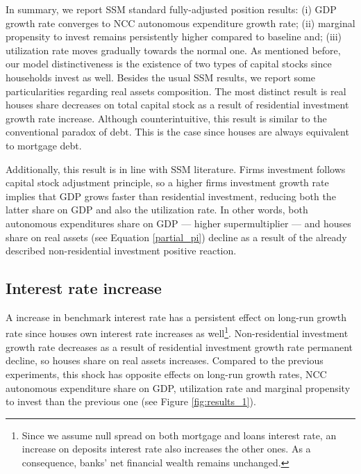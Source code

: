 \documentclass[11pt]{article}
\begin{document}
In summary, we report SSM standard fully-adjusted position results:
    (i) GDP growth rate converges to NCC autonomous expenditure growth rate;
    (ii) marginal propensity to invest remains persistently higher compared to baseline and;
    (iii) utilization rate moves gradually towards the normal one.
As mentioned before, our model distinctiveness is the existence of two types of capital stocks since households invest as well.
Besides the usual SSM results, we report some particularities regarding real assets composition.
The most distinct result is real houses share decreases on total capital stock as a result of residential investment growth rate increase.
Although counterintuitive, this result is similar to the conventional paradox of debt.
This is the case since houses are always equivalent to  mortgage debt.


Additionally, this result is in line with SSM literature.
Firms investment follows capital stock adjustment principle, so a higher firms investment growth rate implies that
GDP grows faster than residential investment, reducing both the latter share on GDP and
also the utilization rate.
In other words, both autonomous expenditures share on GDP --- higher supermultiplier --- and houses share on real assets (see Equation \ref{partial_pi}) decline as a result of the already described non-residential investment positive reaction.
\subsection{Interest rate increase}
\label{sec:orgb558678}
\label{sec:Exp3}

A increase in benchmark interest rate  has a persistent effect on long-run growth rate since houses own interest rate increases as well\footnote{Since we assume null spread on both mortgage and loans interest rate, an increase on deposits interest rate also increases the other ones. As a consequence, banks' net financial wealth remains unchanged.}.
Non-residential investment growth rate decreases as a result of residential investment growth rate permanent decline, so houses share on real assets increases.
Compared to the previous experiments, this shock has opposite effects on long-run growth rates, NCC autonomous expenditure share on GDP, utilization rate and marginal propensity to invest  than the previous one (see Figure \ref{fig:results_1}).
\end{document}
